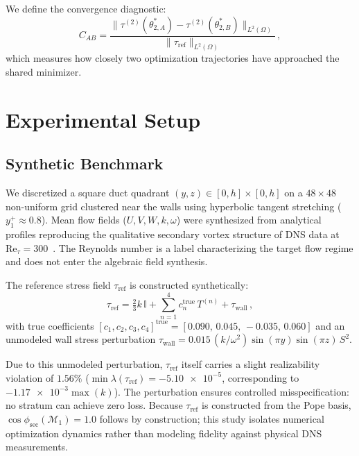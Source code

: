\documentclass[preprint,aps,prb,longbibliography,superscriptaddress]{revtex4-2}
\newcommand{\tref}{\tau_{\text{ref}}}
\newcommand{\id}{\mathbb{I}}
\begin{document}
We define the convergence diagnostic:
\begin{equation}\label{eq:CAB}
  C_{AB}
  = \frac{\|\tau^{(2)}(\theta_{2,A}^*) -
          \tau^{(2)}(\theta_{2,B}^*)\|_{L^2(\Omega)}}
         {\|\tref\|_{L^2(\Omega)}}\,,
\end{equation}
which measures how closely two optimization trajectories have approached the
shared minimizer.

\section{Experimental Setup}\label{sec:setup}

\subsection{Synthetic Benchmark}\label{sec:benchmark}

We discretized a square duct quadrant $(y,z) \in [0,h] \times [0,h]$ on a
$48 \times 48$ non-uniform grid clustered near the walls using hyperbolic
tangent stretching ($y_1^+ \approx 0.8$). Mean flow fields ($U, V, W, k, \omega$)
were synthesized from analytical profiles reproducing the qualitative secondary
vortex structure of DNS data at $\mathrm{Re}_\tau = 300$~\cite{Pinelli2010}.
The Reynolds number is a label characterizing the target flow regime and does
not enter the algebraic field synthesis.

The reference stress field $\tref$ is constructed synthetically:
\begin{equation}\label{eq:tref}
  \tref = \tfrac{2}{3}k\,\id + \sum_{n=1}^{4} c_n^{\mathrm{true}}\, T^{(n)}
  + \tau_{\mathrm{wall}}\,,
\end{equation}
with true coefficients $[c_1, c_2, c_3, c_4]^{\mathrm{true}} =
[0.090,\, 0.045,\, {-}0.035,\, 0.060]$ and an unmodeled wall stress perturbation
$\tau_{\mathrm{wall}} = 0.015\,(k/\omega^2)\sin(\pi y)\sin(\pi z)\,S^2$.

Due to this unmodeled perturbation, $\tref$ itself carries a slight realizability
violation of $1.56\%$ ($\min\lambda(\tref) = \num{-5.10e-5}$, corresponding to
$\num{-1.17e-3}\max(k)$). The perturbation ensures controlled misspecification:
no stratum can achieve zero loss. Because $\tref$ is constructed from the Pope
basis, $\cos\phi_{\mathrm{sec}}(\mathcal{M}_1) = 1.0$ follows by construction;
this study isolates numerical optimization dynamics rather than modeling
fidelity against physical DNS measurements.
\end{document}
